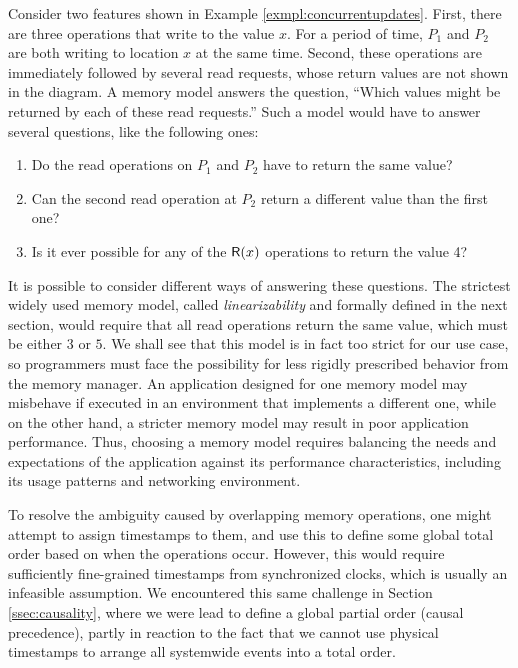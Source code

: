 \documentclass[]             %
{NASA}                       %
\theoremstyle{definition}
\begin{document}
Consider two features shown in Example \ref{exmpl:concurrentupdates}.
First, there are three operations that write to the value $x$. For a
period of time, $P_1$ and $P_2$ are both writing to location $x$ at
the same time. Second, these operations are immediately followed by
several read requests, whose return values are not shown in the
diagram. A memory model answers the question, ``Which values might be
returned by each of these read requests.'' Such a model would have to
answer several questions, like the following ones:
\begin{enumerate}
\item Do the read operations on $P_1$ and $P_2$ have to return the same value?
\item Can the second read operation at $P_2$ return a different value
  than the first one?
\item Is it ever possible for any of the $\mathsf{R}\!\left(x\right)$ operations to
  return the value 4?
\end{enumerate}

It is possible to consider different ways of answering these
questions. The strictest widely used memory model, called
\emph{linearizability} and formally defined in the next section, would
require that all read operations return the same value, which must be
either $3$ or $5$. We shall see that this model is in fact too strict
for our use case, so programmers must face the possibility for less
rigidly prescribed behavior from the memory manager. An application
designed for one memory model may misbehave if executed in an
environment that implements a different one, while on the other hand,
a stricter memory model may result in poor application
performance. Thus, choosing a memory model requires balancing the
needs and expectations of the application against its performance
characteristics, including its usage patterns and networking
environment.

To resolve the ambiguity caused by overlapping memory operations, one
might attempt to assign timestamps to them, and use this to define
some global total order based on when the operations occur. However,
this would require sufficiently fine-grained timestamps from
synchronized clocks, which is usually an infeasible assumption. We
encountered this same challenge in Section \ref{ssec:causality}, where
we were lead to define a global partial order (causal precedence),
partly in reaction to the fact that we cannot use physical timestamps
to arrange all systemwide events into a total order.
\end{document}

